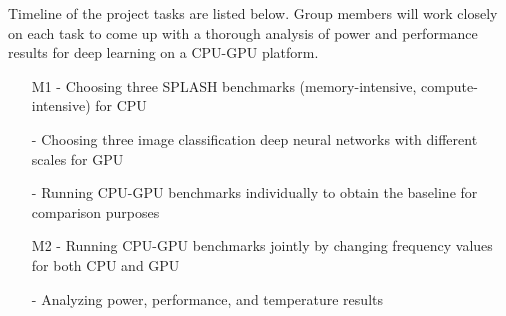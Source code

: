 Timeline of the project tasks are listed below. Group members will work closely on each task to come up with a thorough analysis of power and performance results for deep learning on a CPU-GPU platform. 

\begin{itemize}
\item[M1 -] Choosing three SPLASH benchmarks (memory-intensive, compute-intensive) for CPU
\item[-] Choosing three image classification deep neural networks with different scales for GPU
\item[-] Running CPU-GPU benchmarks individually to obtain the baseline for comparison purposes
\item[M2 -] Running CPU-GPU benchmarks jointly by changing frequency values for both CPU and GPU
\item[-] Analyzing power, performance, and temperature results 
\end{itemize}